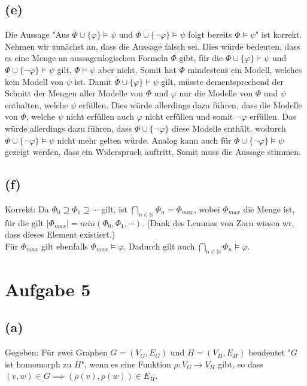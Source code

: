 \documentclass[11pt, a4paper]{article}
\begin{document}
\subsection*{(e)}
Die Aussage "Aus $\Phi\cup\{\varphi \}\models \psi$ und $\Phi\cup\{\neg\varphi \}\models\psi$ folgt bereits $\Phi\models\psi$" ist korrekt.\newline
Nehmen wir zunächst an, dass die Aussage falsch sei. Dies würde bedeuten, dass es eine Menge an aussagenlogischen Formeln $\Phi$ gibt, für die  $\Phi\cup\{\varphi \}\models \psi$ und $\Phi\cup\{\neg \varphi \}\models\psi$ gilt, $\Phi\models\psi$ aber nicht. Somit hat $\Phi$ mindestens ein Modell, welches kein Modell von $\psi$ ist. Damit $\Phi\cup\{\varphi \}\models \psi$ gilt, müsste dementsprechend der Schnitt der Mengen aller Modelle von $\Phi$ und $\varphi$ nur die Modelle von $\Phi$ und $\psi$ enthalten, welche $\psi$ erfüllen. Dies würde allerdings dazu führen, dass die Modelle von $\Phi$, welche $\psi$ nicht erfüllen auch $\varphi$ nicht erfüllen und somit $\neg \varphi$ erfüllen. Das würde allerdings dazu führen, dass $\Phi \cup\{\neg\varphi\}$ diese Modelle enthält, wodurch $\Phi\cup\{\neg\varphi \}\models\psi$ nicht mehr gelten würde. Analog kann auch für $\Phi\cup\{\neg\varphi \}\models\psi$ gezeigt werden, dass ein Widerspruch auftritt. Somit muss die Aussage stimmen.

\subsection*{(f)}
Korrekt:
Da $\Phi_0 \supseteq \Phi_1 \supseteq \cdots$ gilt, ist $\bigcap_{n \in \mathbb{N}} \Phi_n = \Phi_{max}$,  wobei $\Phi_{max}$ die Menge ist, für die gilt $|\Phi_{max}| = min(\Phi_0, \Phi_1, \cdots)$.
(Dank des Lemmas von Zorn wissen wr, dass dieses Element existiert.)\\
Für $\Phi_{max}$ gilt ebenfalls $\Phi_{max} \models \varphi$.
Dadurch gilt auch $\bigcap_{n \in \mathbb{N}} \Phi_n \models \varphi$.

\section*{Aufgabe 5}
\subsection*{(a)}
Gegeben:
Für zwei Graphen $G=(V_G,E_G)$ und $H=(V_H,E_H)$ beudeutet "$G$ ist homomorph zu $H$", wenn es eine Funktion $\rho: V_G \rightarrow V_H$ gibt, so dass $(v,w) \in G \implies (\rho(v),\rho(w)) \in E_H$.
\end{document}
